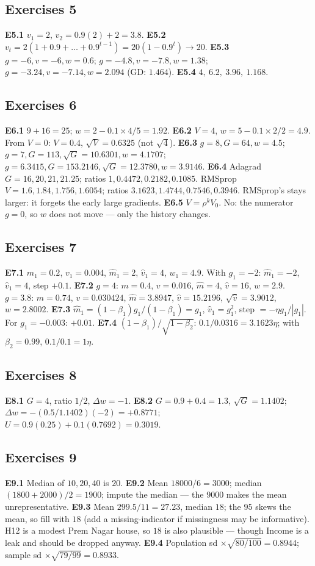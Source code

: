 \documentclass[11pt]{article}
\newcommand{\ans}[1]{\subsection*{#1}}
\begin{document}
\ans{Exercises 5}
\textbf{E5.1} $v_1 = 2$, $v_2 = 0.9(2) + 2 = 3.8$.
\textbf{E5.2} $v_t = 2(1 + 0.9 + \dots + 0.9^{t-1}) = 20(1 - 0.9^t) \to 20$.
\textbf{E5.3} $g = -6, v = -6, w = 0.6$; $g = -4.8, v = -7.8, w = 1.38$;
$g = -3.24, v = -7.14, w = 2.094$ (GD: $1.464$).
\textbf{E5.4} $4,\ 6.2,\ 3.96,\ 1.168$.

\ans{Exercises 6}
\textbf{E6.1} $9 + 16 = 25$; $w = 2 - 0.1 \times 4/5 = 1.92$.
\textbf{E6.2} $V = 4$, $w = 5 - 0.1 \times 2/2 = 4.9$. From $V = 0$:
$V = 0.4$, $\sqrt V = 0.6325$ (not $\sqrt4$).
\textbf{E6.3} $g = 8, G = 64, w = 4.5$; $g = 7, G = 113, \sqrt G = 10.6301,
w = 4.1707$; $g = 6.3415, G = 153.2146, \sqrt G = 12.3780, w = 3.9146$.
\textbf{E6.4} Adagrad $G = 16, 20, 21, 21.25$; ratios $1, 0.4472, 0.2182,
0.1085$. RMSprop $V = 1.6, 1.84, 1.756, 1.6054$; ratios $3.1623, 1.4744,
0.7546, 0.3946$. RMSprop's stays larger: it forgets the early large gradients.
\textbf{E6.5} $V = \rho^kV_0$. No: the numerator $g = 0$, so $w$ does not move
--- only the history changes.

\ans{Exercises 7}
\textbf{E7.1} $m_1 = 0.2$, $v_1 = 0.004$, $\hat m_1 = 2$, $\hat v_1 = 4$,
$w_1 = 4.9$. With $g_1 = -2$: $\hat m_1 = -2$, $\hat v_1 = 4$, step $+0.1$.
\textbf{E7.2} $g = 4$: $m = 0.4$, $v = 0.016$, $\hat m = 4$, $\hat v = 16$,
$w = 2.9$. $g = 3.8$: $m = 0.74$, $v = 0.030424$, $\hat m = 3.8947$,
$\hat v = 15.2196$, $\sqrt{\hat v} = 3.9012$, $w = 2.8002$.
\textbf{E7.3} $\hat m_1 = (1-\beta_1)g_1/(1-\beta_1) = g_1$,
$\hat v_1 = g_1^2$, step $= -\eta g_1/|g_1|$. For $g_1 = -0.003$: $+0.01$.
\textbf{E7.4} $(1-\beta_1)/\sqrt{1-\beta_2}$: $0.1/0.0316 = 3.1623\eta$;
with $\beta_2 = 0.99$, $0.1/0.1 = 1\eta$.

\ans{Exercises 8}
\textbf{E8.1} $G = 4$, ratio $1/2$, $\Delta w = -1$.
\textbf{E8.2} $G = 0.9 + 0.4 = 1.3$, $\sqrt G = 1.1402$;
$\Delta w = -(0.5/1.1402)(-2) = +0.8771$; $U = 0.9(0.25) + 0.1(0.7692) =
0.3019$.

\ans{Exercises 9}
\textbf{E9.1} Median of $10, 20, 40$ is $20$.
\textbf{E9.2} Mean $18000/6 = 3000$; median $(1800 + 2000)/2 = 1900$; impute
the median --- the 9000 makes the mean unrepresentative.
\textbf{E9.3} Mean $299.5/11 = 27.23$, median $18$; the $95$ skews the mean,
so fill with $18$ (add a missing-indicator if missingness may be informative).
H12 is a modest Prem Nagar house, so $18$ is also plausible --- though Income
is a leak and should be dropped anyway.
\textbf{E9.4} Population sd $\times\sqrt{80/100} = 0.8944$; sample sd
$\times\sqrt{79/99} = 0.8933$.
\end{document}
